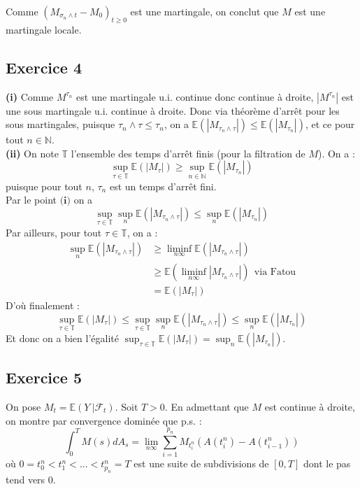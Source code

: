 \documentclass[a4paper,12pt]{article}
\newcommand{\E}{\mathbb{E}}
\newcommand{\f}{\mathcal{F}}
\newcommand{\n}{\mathbb{N}}
\begin{document}
Comme $(M_{\sigma_n \wedge t} - M_0)_{t \geq 0}$ est une martingale, on conclut que $M$ est une martingale locale. \\

\subsection{Exercice 4}
\textbf{(i)} Comme $M^{\tau_n}$ est une martingale u.i. continue donc continue à droite, $|M^{\tau_n}|$ est une sous martingale u.i. continue à droite. Donc via théorème d'arrêt pour les sous martingales, puisque $\tau_n \wedge \tau \leq \tau_n$, on a $\E (|M_{\tau_n \wedge \tau}|) \leq \E (|M_{\tau_n}|)$, et ce pour tout $n \in \n$. \\

\textbf{(ii)} On note $\mathbb{T}$ l'ensemble des temps d'arrêt finis (pour la filtration de $M$). On a :
$$\sup_{\tau \in \mathbb{T}} \E (|M_{\tau}|) \geq \sup_{n \in \n} \E (|M_{\tau_n}|)$$ puisque pour tout $n$, $\tau_n$ est un temps d'arrêt fini. \\
 
Par le point $\textbf{(i)}$ on a 
$$\sup_{\tau \in \mathbb{T}} \sup_n \E(|M_{\tau_n \wedge \tau}|) \leq \sup_n \E (|M_{\tau_n}|)$$
Par ailleurs, pour tout $\tau \in \mathbb{T}$, on a :
\begin{align*}
\sup_n \E(|M_{\tau_n \wedge \tau}|) & \geq \liminf_{n \infty} \E(|M_{\tau_n \wedge \tau}|) \\
& \geq \E(\liminf_{n \infty} |M_{\tau_n \wedge \tau}|) \ \ \text{via Fatou} \\
& = \E (|M_{\tau}|)
\end{align*}
D'où finalement : 
$$\sup_{\tau \in \mathbb{T}} \E (|M_{\tau}|) \leq \sup_{\tau \in \mathbb{T}} \sup_n \E(|M_{\tau_n \wedge \tau}|) \leq \sup_n \E (|M_{\tau_n}|)$$
Et donc on a bien l'égalité $\sup_{\tau \in \mathbb{T}} \E (|M_{\tau}|) = \sup_n \E (|M_{\tau_n}|)$. \\

\subsection{Exercice 5} 
On pose $M_t = \E (Y \ | \f_t)$. Soit $T>0$. En admettant que $M$ est continue à droite, on montre par convergence dominée que p.s. :
$$\int_{0}^T M(s) d A_s = \lim_{n \infty} \sum_{i=1}^{p_n} M_{t_{i}^n} (A(t_i^n)-A(t_{i-1}^n))$$ 
où $0=t_0^n <t_1^n < ... < t_{p_n}^n = T$ est une suite de subdivisions de $[0,T]$ dont le pas tend vers $0$. \\
\end{document}
